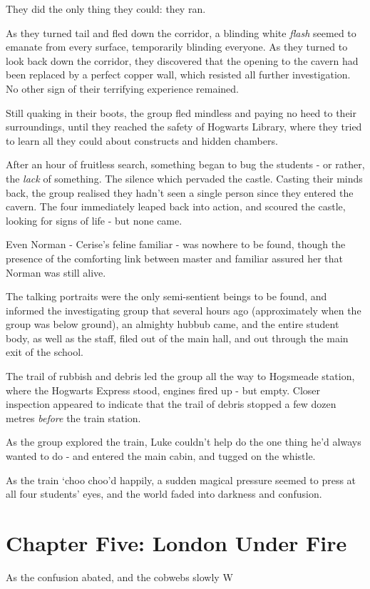 \documentclass[oneside]{book}
\begin{document}
They did the only thing they could: they ran. 

As they turned tail and fled down the corridor, a blinding white {\it flash} seemed to emanate from every surface, temporarily blinding everyone. As they turned to look back down the corridor, they discovered that the opening to the cavern had been replaced by a perfect copper wall, which resisted all further investigation. No other sign of their terrifying experience remained. 

Still quaking in their boots, the group fled mindless and paying no heed to their surroundings, until they reached the safety of Hogwarts Library, where they tried to learn all they could about constructs and hidden chambers. 

After an hour of fruitless search, something began to bug the students - or rather, the {\it lack} of something. The silence which pervaded the castle. Casting their minds back, the group realised they hadn't seen a single person since they entered the cavern. The four immediately leaped back into action, and scoured the castle, looking for signs of life - but none came. 

Even Norman - Cerise's feline familiar - was nowhere to be found, though the presence of the comforting link between master and familiar assured her that Norman was still alive. 

The talking portraits were the only semi-sentient beings to be found, and informed the investigating group that several hours ago (approximately when the group was below ground), an almighty hubbub came, and the entire student body, as well as the staff, filed out of the main hall, and out through the main exit of the school. 

The trail of rubbish and debris led the group all the way to Hogsmeade station, where the Hogwarts Express stood, engines fired up - but empty. Closer inspection appeared to indicate that the trail of debris stopped a few dozen metres {\it before} the train station. 

As the group explored the train, Luke couldn't help do the one thing he'd always wanted to do - and entered the main cabin, and tugged on the whistle. 

As the train `choo choo'd happily, a sudden magical pressure seemed to press at all four students' eyes, and the world faded into darkness and confusion. 

\section{Chapter Five: London Under Fire}

As the confusion abated, and the cobwebs slowly W
\end{document}
